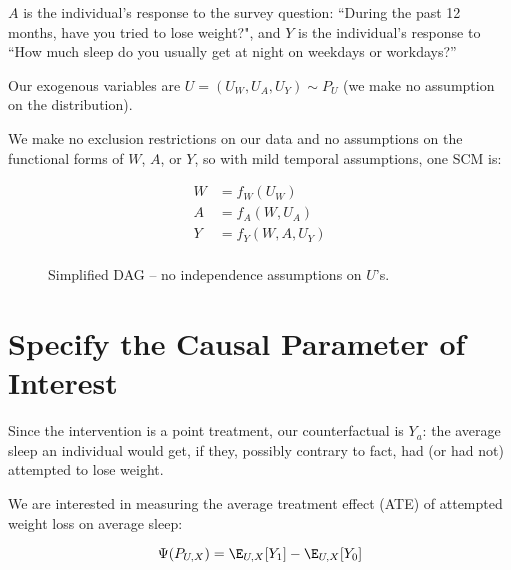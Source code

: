 \documentclass{article}
\begin{document}
$A$ is the individual's response to the survey question: ``During the past 12 months, have you tried to lose weight?", and $Y$ is the individual's response to ``How much sleep do you usually get at night on weekdays or workdays?''  

Our exogenous variables are $U = (U_W, U_A, U_Y) \sim P_U$ (we make no assumption on the distribution).  

We make no exclusion restrictions on our data and no assumptions on the functional forms of $W$, $A$, or $Y$, so with mild temporal assumptions, one SCM is:

\begin{align*}
W &= f_{W}(U_{W}) \\
A &= f_{A}(W,U_{A}) \\
Y &= f_{Y}(W,A,U_{Y}) \\
\end{align*}

\begin{figure}[h]
    \centering
  \caption{Simplified DAG -- no independence assumptions on $U$'s.}
  \label{fig:DAG}
\end{figure}


\section{Specify the Causal Parameter of Interest}

Since the intervention is a point treatment, our counterfactual is $Y_{a}$: the average sleep an individual would get, if they, possibly contrary to fact, had (or had not) attempted to lose weight.

We are interested in measuring the average treatment effect (ATE) of attempted weight loss on average sleep:

$$\Psi(P_{U,X}) = \E_{U,X}[Y_1] - \E_{U,X}[Y_0]$$
\end{document}
